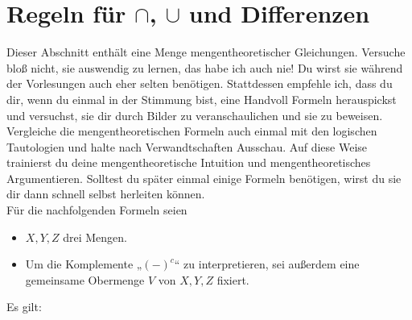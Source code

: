 \section{Regeln für $\cap$, $\cup$ und Differenzen}
Dieser Abschnitt enthält eine Menge mengentheoretischer Gleichungen. Versuche bloß nicht, sie auswendig zu lernen, das habe ich auch nie! Du wirst sie während der Vorlesungen auch eher selten benötigen. Stattdessen empfehle ich, dass du dir, wenn du einmal in der Stimmung bist, eine Handvoll Formeln herauspickst und versuchst, sie dir durch Bilder zu veranschaulichen und sie zu beweisen. Vergleiche die mengentheoretischen Formeln auch einmal mit den logischen Tautologien und halte nach Verwandtschaften Ausschau. Auf diese Weise trainierst du deine mengentheoretische Intuition und mengentheoretisches Argumentieren. Solltest du später einmal einige Formeln benötigen, wirst du sie dir dann schnell selbst herleiten können. \\[0.5em]
Für die nachfolgenden Formeln seien
\begin{itemize}
    \item $X,Y,Z$ drei Mengen.
    \item Um die Komplemente „$(-)^c$“ zu interpretieren, sei außerdem eine gemeinsame Obermenge $V$ von $X,Y,Z$ fixiert.
\end{itemize}
Es gilt:
\begingroup
\allowdisplaybreaks
